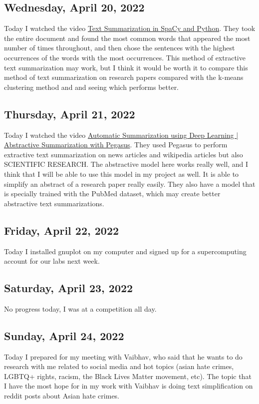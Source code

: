 \documentclass[11pt,letterpaper]{article}
\begin{document}
\subsection{Wednesday, April 20, 2022}
Today I watched the video \href{https://www.youtube.com/watch?v=XcZGKAF5zxg}{Text Summarization in SpaCy and Python}. They took the entire document and found the most common words that appeared the most number of times throughout, and then chose the sentences with the highest occurrences  of the words with the most occurrences. This method of extractive text summarization may work, but I think it would be worth it to compare this method of text summarization on research papers compared with the k-means clustering method and and seeing which performs better.

\subsection{Thursday, April 21, 2022}
Today I watched the video \href{https://www.youtube.com/watch?v=Yo5Hw8aV3vY}{Automatic Summarization using Deep Learning | Abstractive Summarization with Pegasus}. They used Pegasus to perform extractive text summarization on news articles and wikipedia articles but also SCIENTIFIC RESEARCH. The abstractive model here works really well, and I think that I will be able to use this model in my project as well. It is able to simplify an abstract of a research paper really easily. They also have a model that is specially trained with the PubMed dataset, which may create better abstractive text summarizations.

\subsection{Friday, April 22, 2022}
Today I installed gnuplot on my computer and signed up for a supercomputing account for our labs next week. 

\subsection{Saturday, April 23, 2022}
No progress today, I was at a competition all day.

\subsection{Sunday, April 24, 2022}
Today I prepared for my meeting with Vaibhav, who said that he wants to do research with me related to social media and hot topics (asian hate crimes, LGBTQ+ rights, racism, the Black Lives Matter movement, etc). The topic that I have the most hope for in my work with Vaibhav is doing text simplification on reddit posts about Asian hate crimes.
\end{document}

